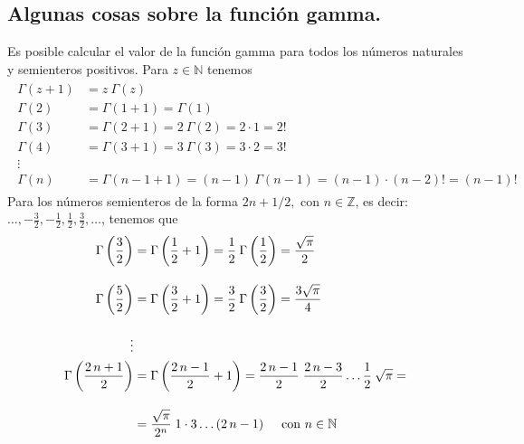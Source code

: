 \subsection{Algunas cosas sobre la función gamma.}
Es posible calcular el valor de la función gamma para todos los números naturales y semienteros positivos. Para $z \in \mathbb{N}$ tenemos
\begin{align*}
\begin{aligned}
\Gamma (z+1) &= z \: \Gamma (z) \\
\Gamma (2) &= \Gamma (1+1) = \Gamma (1) \\
\Gamma (3) &= \Gamma (2+1) = 2 \: \Gamma (2)= 2 \cdot 1 = 2! \\
\Gamma (4) &= \Gamma (3+1) = 3 \: \Gamma (3)= 3 \cdot 2 = 3! \\
\vdots \\
\Gamma (n) &= \Gamma (n-1+1) = (n-1) \: \Gamma (n-1)= (n - 1) \cdot (n - 2)! = (n-1)!
\end{aligned}
\end{align*}
Para los números semienteros de la forma $2n+1/2, \mbox{ con } n \in \mathbb{Z}$, es decir: $\ldots, -\frac{3}{2}, - \frac{1}{2}, \frac{1}{2}, \frac{3}{2}, \ldots$, tenemos que
\begin{align*}
\begin{aligned}
\Gamma \left( \dfrac{3}{2} \right) &= \Gamma \left( \dfrac{1}{2} + 1 \right) = \dfrac{1}{2} \: \Gamma \left( \dfrac{1}{2} \right) = \dfrac{\sqrt{\pi}}{2} \\[1em]
\Gamma \left( \dfrac{5}{2} \right) &= \Gamma \left( \dfrac{3}{2} + 1 \right) = \dfrac{3}{2} \: \Gamma \left( \dfrac{3}{2} \right) = \dfrac{3 \sqrt{\pi}}{4} \\[1em]
\vdots \\
\Gamma \left( \dfrac{2 \, n + 1}{2} \right) &= \Gamma \left( \dfrac{2 \, n - 1}{2} + 1 \right) = \dfrac{2 \, n - 1}{2} \; \dfrac{2 \, n - 3}{2} \ldots \dfrac{1}{2} \: \sqrt{\pi} =  \\[1em]
&= \dfrac{\sqrt{\pi}}{2^{n}} \; 1 \cdot 3 \ldots (2 \, n-1) \hspace{0.5cm} \mbox{con } n \in \mathbb{N}
\end{aligned}
\end{align*}
